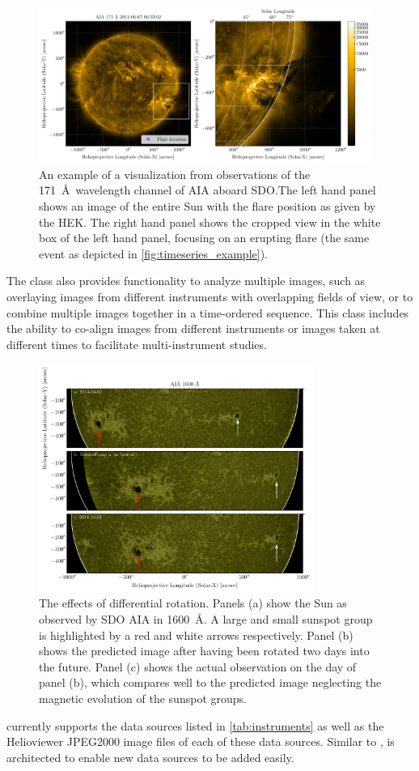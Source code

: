 \begin{figure}
    \centering
    \includegraphics[width=0.97\textwidth]{figures/map_example.pdf}
    \caption{An example of a \Map visualization from observations of the 171~\AA\ wavelength channel of AIA aboard SDO.The left hand panel shows an image of the entire Sun with the flare position as given by the HEK. The right hand panel shows the cropped view in the white box of the left hand panel, focusing on an erupting flare (the same event as depicted in \autoref{fig:timeseries_example}).}
    \label{fig:map_example}
\end{figure}

The \Map class also provides functionality to analyze multiple images, such as overlaying images from different instruments with overlapping fields of view, or to combine multiple images together in a time-ordered sequence.
This class includes the ability to co-align images from different instruments or images taken at different times to facilitate multi-instrument studies.


\begin{figure}
    \center
    \includegraphics[width = 0.8\textwidth]{figures/fig_diff_rot_1600.pdf}
    \caption{The effects of differential rotation.
    Panels (a) show the Sun as observed by SDO AIA in 1600~\AA{}.
    A large and small sunspot group is highlighted by a red and white arrows respectively.
    Panel (b) shows the predicted image after having been rotated two days into the future.
    Panel (c) shows the actual observation on the day of panel (b), which compares well to the predicted image neglecting the magnetic evolution of the sunspot groups.}
    \label{fig:diff_rot}
\end{figure}

\Map currently supports the data sources listed in \autoref{tab:instruments} as well as the Helioviewer JPEG2000 image files of  each of these data sources. 
Similar to \Timeseries, \Map is architected to enable new data sources to be added easily.
